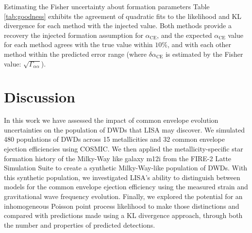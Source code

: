 \documentclass[twocolumn]{aastex631}
\newcommand*{\alphaCE}{\alpha_{\mathrm{CE}}}
\begin{document}
\begin{subsection}{Estimating the Fisher uncertainty about formation parameters}
Table \ref{tab:goodness} exhibits the agreement of quadratic fits to
    the likelihood and KL divergence for each method with
    the injected value.
Both methods provide a recovery the injected formation assumption
    for $\alphaCE$,
    and the expected $\alphaCE$ value for each method
    agrees with the true value within $10 \%$,
    and with each other method within the predicted error range
    (where $\delta \alphaCE$ is estimated by the Fisher value: 
    $\sqrt{\Gamma_{\alpha \alpha}}$).

\end{subsection}

 \section{Discussion}
\label{sec:discussion}
In this work we have assessed the impact of common envelope evolution 
    uncertainties on the population of DWDs that LISA may discover. 
We simulated 480 populations of DWDs across 15 metallicities and
    32 common envelope ejection efficiencies using COSMIC.
We then applied the metallicity-specific star formation history of the Milky-Way 
    like galaxy m12i from the FIRE-2 Latte Simulation Suite
    to create a synthetic Milky-Way-like population of DWDs. 
With this synthetic population, we investigated LISA's ability to distinguish between models for 
    the common envelope ejection efficiency using the measured strain and 
    gravitational wave frequency evolution. 
Finally, we explored the potential for an inhomogeneous Poisson point process
    likelihood to make those distinctions and compared with predictions
    made using a KL divergence approach,
    through both the number and properties of predicted detections.
\end{document}

